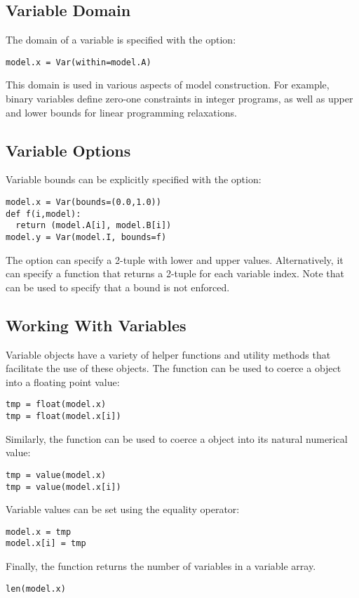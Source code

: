 \subsection{Variable Domain}

The domain of a variable is specified with the  option:
\begin{lstlisting}
model.x = Var(within=model.A)
\end{lstlisting}
This domain is used in various aspects of model construction.  For example, binary variables define zero-one constraints in integer programs, as well as upper and lower bounds for linear programming relaxations.  


\subsection{Variable Options}

Variable bounds can be explicitly specified
with the  option:
\begin{lstlisting}
model.x = Var(bounds=(0.0,1.0))
def f(i,model):
  return (model.A[i], model.B[i])
model.y = Var(model.I, bounds=f)
\end{lstlisting}
The  option can specify a 2-tuple with lower and upper values.  Alternatively,
it can specify a function that returns a 2-tuple for each variable index.  Note that  can be used to specify that a bound is not enforced.


\subsection{Working With Variables}

Variable objects have a variety of helper functions and utility methods that facilitate 
the use of these objects.  The  function can be used to coerce a  object into a floating point value:
\begin{lstlisting}
tmp = float(model.x)
tmp = float(model.x[i])
\end{lstlisting}
Similarly, the  function can be used to coerce a  object
into its natural numerical value:
\begin{lstlisting}
tmp = value(model.x)
tmp = value(model.x[i])
\end{lstlisting}
Variable values can be set using the equality operator:
\begin{lstlisting}
model.x = tmp
model.x[i] = tmp
\end{lstlisting}
Finally, the  function returns the number of variables in a variable array.
\begin{lstlisting}
len(model.x)
\end{lstlisting}


